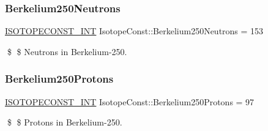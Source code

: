 \subsubsection{\texorpdfstring{Berkelium250\+Neutrons}{Berkelium250Neutrons}}
{\footnotesize\ttfamily \mbox{\hyperlink{group___isotope_const-_macros_ga5f18360b3e99483a35c32d789e62621c}{I\+S\+O\+T\+O\+P\+E\+C\+O\+N\+S\+T\+\_\+\+I\+NT}} Isotope\+Const\+::\+Berkelium250\+Neutrons = 153}

\$ \$ Neutrons in Berkelium-\/250. \mbox{\label{group___isotope_const-_berkelium-_bk250_ga07a1f136d024edbde64c34f3f2736430}} 
\subsubsection{\texorpdfstring{Berkelium250\+Protons}{Berkelium250Protons}}
{\footnotesize\ttfamily \mbox{\hyperlink{group___isotope_const-_macros_ga5f18360b3e99483a35c32d789e62621c}{I\+S\+O\+T\+O\+P\+E\+C\+O\+N\+S\+T\+\_\+\+I\+NT}} Isotope\+Const\+::\+Berkelium250\+Protons = 97}

\$ \$ Protons in Berkelium-\/250. 